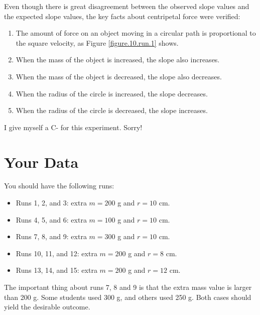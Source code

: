 Even though there is great disagreement between the observed slope values and the expected slope values, the key facts about centripetal force were verified:
\begin{enumerate}
    \item The amount of force on an object moving in a circular path is proportional to the square velocity, as Figure \ref{figure.10.run.1} shows.
    \item When the mass of the object is increased, the slope also increases.
    \item When the mass of the object is decreased, the slope also decreases.
    \item When the radius of the circle is increased, the slope decreases.
    \item When the radius of the circle is decreased, the slope increases.
\end{enumerate}
I give myself a C- for this experiment. Sorry!
\section{Your Data}
You should have the following runs:
\begin{itemize}
    \item Runs 1, 2, and 3: extra $m = 200$ g and $r = 10$ cm.
    \item Runs 4, 5, and 6: extra $m = 100$ g and $r = 10$ cm.
    \item Runs 7, 8, and 9: extra $m = 300$ g and $r = 10$ cm.
    \item Runs 10, 11, and 12: extra $m = 200$ g and $r = 8$ cm.
    \item Runs 13, 14, and 15: extra $m = 200$ g and $r = 12$ cm.
\end{itemize}
The important thing about runs 7, 8 and 9 is that the extra mass value is larger than 200 g. Some students used 300 g, and others used 250 g. Both cases should yield the desirable outcome.
\newpage
